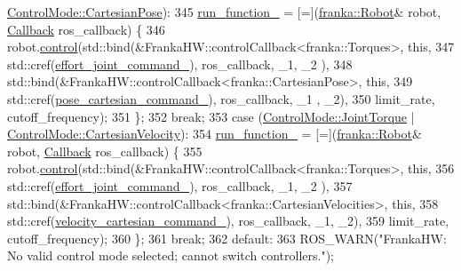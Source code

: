 \begin{DoxyCode}
      \hyperlink{namespacefranka__hw_afa416558ce4baace5ac6c71bd5d2c98cab5a449319cc586903a8995a0b463df50}{ControlMode::CartesianPose}):
345       \hyperlink{classfranka__hw_1_1FrankaHW_ab53d17aecdb62936defdcde99e9b88b8}{run\_function\_} = [=](\hyperlink{classfranka_1_1Robot}{franka::Robot}& robot, 
      \hyperlink{classfranka__hw_1_1FrankaHW_ac576bd5140a03864888c68519daa5aa4}{Callback} ros\_callback) \{
346         robot.\hyperlink{classfranka_1_1Robot_a5b5ba0a4f2bfd20be963b05622e629e1}{control}(std::bind(&FrankaHW::controlCallback<franka::Torques>, \textcolor{keyword}{this},
347                                 std::cref(\hyperlink{classfranka__hw_1_1FrankaHW_a718469d0646cacde1bd8ad1b798a528c}{effort\_joint\_command\_}), ros\_callback, \_1, \_2
      ),
348                       std::bind(&FrankaHW::controlCallback<franka::CartesianPose>, \textcolor{keyword}{this},
349                                 std::cref(\hyperlink{classfranka__hw_1_1FrankaHW_a28885bdd6202f0efbe793725e5d2497b}{pose\_cartesian\_command\_}), ros\_callback, \_1
      , \_2),
350                       limit\_rate, cutoff\_frequency);
351       \};
352       \textcolor{keywordflow}{break};
353     \textcolor{keywordflow}{case} (\hyperlink{namespacefranka__hw_afa416558ce4baace5ac6c71bd5d2c98ca6c640e0814bb12aecaa28d237d393467}{ControlMode::JointTorque} | 
      \hyperlink{namespacefranka__hw_afa416558ce4baace5ac6c71bd5d2c98ca5f4d2e0f06b2be984d61e898b354da1e}{ControlMode::CartesianVelocity}):
354       \hyperlink{classfranka__hw_1_1FrankaHW_ab53d17aecdb62936defdcde99e9b88b8}{run\_function\_} = [=](\hyperlink{classfranka_1_1Robot}{franka::Robot}& robot, 
      \hyperlink{classfranka__hw_1_1FrankaHW_ac576bd5140a03864888c68519daa5aa4}{Callback} ros\_callback) \{
355         robot.\hyperlink{classfranka_1_1Robot_a5b5ba0a4f2bfd20be963b05622e629e1}{control}(std::bind(&FrankaHW::controlCallback<franka::Torques>, \textcolor{keyword}{this},
356                                 std::cref(\hyperlink{classfranka__hw_1_1FrankaHW_a718469d0646cacde1bd8ad1b798a528c}{effort\_joint\_command\_}), ros\_callback, \_1, \_2
      ),
357                       std::bind(&FrankaHW::controlCallback<franka::CartesianVelocities>, \textcolor{keyword}{this},
358                                 std::cref(\hyperlink{classfranka__hw_1_1FrankaHW_aaa601f471de0a83874ba1f9de038eb30}{velocity\_cartesian\_command\_}), 
      ros\_callback, \_1, \_2),
359                       limit\_rate, cutoff\_frequency);
360       \};
361       \textcolor{keywordflow}{break};
362     \textcolor{keywordflow}{default}:
363       ROS\_WARN(\textcolor{stringliteral}{"FrankaHW: No valid control mode selected; cannot switch controllers."});

\end{DoxyCode}
